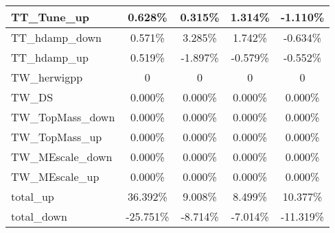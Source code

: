 \begin{table}[]
{\begin{tabular}{|l|c|c|c|c|}
TT\_Tune\_up              & 0.628\%               & 0.315\%               & 1.314\%              & -1.110\%               \\ \hline    
TT\_hdamp\_down                  & 0.571\%                         & 3.285\%                      & 1.742\%                        & -0.634\%                   \\ \hline
TT\_hdamp\_up                    & 0.519\%                           & -1.897\%                        & -0.579\%                          & -0.552\%                     \\ \hline
TW\_herwigpp                & 0                       & 0                    & 0                      & 0                 \\ \hline
TW\_DS                      & 0.000\%                             & 0.000\%                          & 0.000\%                            & 0.000\%                       \\ \hline
TW\_TopMass\_down                & 0.000\%                       & 0.000\%                    & 0.000\%                      & 0.000\%                 \\ \hline
TW\_TopMass\_up                & 0.000\%                       & 0.000\%                    & 0.000\%                      & 0.000\%                 \\ \hline
TW\_MEscale\_down             & 0.000\%                    & 0.000\%                 & 0.000\%                   & 0.000\%              \\ \hline
TW\_MEscale\_up               & 0.000\%                      & 0.000\%                   & 0.000\%                     & 0.000\%                \\ \hline
total\_up                          & 36.392\%                           & 9.008\%                           & 8.499\%                          & 10.377\%                           \\ \hline 
total\_down                        & -25.751\%                         & -8.714\%                         & -7.014\%                        & -11.319\%                         \\ \hline \hline 
\end{tabular}}
\end{table}
